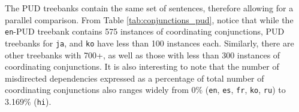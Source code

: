 The PUD treebanks contain the same set of sentences, therefore allowing for a parallel comparison. From Table \ref{tab:conjunctions_pud}, notice that while the \verb|en|-PUD treebank contains 575 instances of coordinating conjunctions, PUD treebanks for \verb|ja|, and \verb|ko| have less than 100 instances each. Similarly, there are other treebanks with 700+, as well as those with less than 300 instances of coordinating conjunctions. It is also interesting to note that the number of misdirected dependencies expressed as a percentage of total number of coordinating conjunctions also ranges widely from 0\% (\verb|en|, \verb|es|, \verb|fr|, \verb|ko|, \verb|ru|) to 3.169\% (\verb|hi|). 

\begin{table}[H]
\centering
{}
\end{table}
